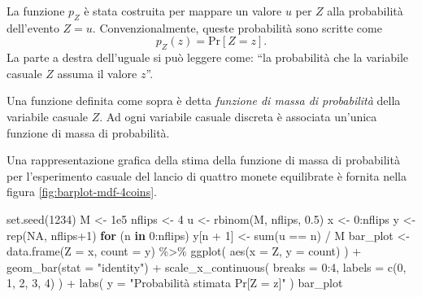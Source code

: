 \documentclass[
  10pt,
  italian,
  a4paper,
  extrafontsizes,onecolumn,openright
  ]{memoir}
\newenvironment{Shaded}{\begin{snugshade}}{\end{snugshade}}
\newcommand{\AttributeTok}[1]{\textcolor[rgb]{0.77,0.63,0.00}{#1}}
\newcommand{\ConstantTok}[1]{\textcolor[rgb]{0.00,0.00,0.00}{#1}}
\newcommand{\ControlFlowTok}[1]{\textcolor[rgb]{0.13,0.29,0.53}{\textbf{#1}}}
\newcommand{\DecValTok}[1]{\textcolor[rgb]{0.00,0.00,0.81}{#1}}
\newcommand{\FloatTok}[1]{\textcolor[rgb]{0.00,0.00,0.81}{#1}}
\newcommand{\FunctionTok}[1]{\textcolor[rgb]{0.00,0.00,0.00}{#1}}
\newcommand{\NormalTok}[1]{#1}
\newcommand{\OtherTok}[1]{\textcolor[rgb]{0.56,0.35,0.01}{#1}}
\newcommand{\SpecialCharTok}[1]{\textcolor[rgb]{0.00,0.00,0.00}{#1}}
\newcommand{\StringTok}[1]{\textcolor[rgb]{0.31,0.60,0.02}{#1}}
\theoremstyle{definition}
\theoremstyle{definition}
\theoremstyle{definition}
\theoremstyle{definition}
\theoremstyle{remark}
\begin{document}
La funzione \(p_Z\) è stata costruita per mappare un valore \(u\) per \(Z\) alla probabilità dell'evento \(Z = u\). Convenzionalmente, queste probabilità sono scritte come
\[
p_Z(z) = \mbox{Pr}[Z = z].
\]
La parte a destra dell'uguale si può leggere come: ``la probabilità che la variabile casuale \(Z\) assuma il valore \(z\)''.

Una funzione definita come sopra è detta \emph{funzione di massa di probabilità} della variabile casuale \(Z\). Ad ogni variabile casuale discreta è associata un'unica funzione di massa di probabilità.

Una rappresentazione grafica della stima della funzione di massa di probabilità per l'esperimento casuale del lancio di quattro monete equilibrate è fornita nella figura \ref{fig:barplot-mdf-4coins}.

\begin{Shaded}
\begin{Highlighting}[]
\FunctionTok{set.seed}\NormalTok{(}\DecValTok{1234}\NormalTok{)}
\NormalTok{M }\OtherTok{\textless{}{-}} \FloatTok{1e5}
\NormalTok{nflips }\OtherTok{\textless{}{-}} \DecValTok{4}
\NormalTok{u }\OtherTok{\textless{}{-}} \FunctionTok{rbinom}\NormalTok{(M, nflips, }\FloatTok{0.5}\NormalTok{)}
\NormalTok{x }\OtherTok{\textless{}{-}} \DecValTok{0}\SpecialCharTok{:}\NormalTok{nflips}
\NormalTok{y }\OtherTok{\textless{}{-}} \FunctionTok{rep}\NormalTok{(}\ConstantTok{NA}\NormalTok{, nflips}\SpecialCharTok{+}\DecValTok{1}\NormalTok{)}
\ControlFlowTok{for}\NormalTok{ (n }\ControlFlowTok{in} \DecValTok{0}\SpecialCharTok{:}\NormalTok{nflips)}
\NormalTok{  y[n }\SpecialCharTok{+} \DecValTok{1}\NormalTok{] }\OtherTok{\textless{}{-}} \FunctionTok{sum}\NormalTok{(u }\SpecialCharTok{==}\NormalTok{ n) }\SpecialCharTok{/}\NormalTok{ M}
\NormalTok{bar\_plot }\OtherTok{\textless{}{-}}
  \FunctionTok{data.frame}\NormalTok{(}\AttributeTok{Z =}\NormalTok{ x, }\AttributeTok{count =}\NormalTok{ y) }\SpecialCharTok{\%\textgreater{}\%} 
  \FunctionTok{ggplot}\NormalTok{(}
    \FunctionTok{aes}\NormalTok{(}\AttributeTok{x =}\NormalTok{ Z, }\AttributeTok{y =}\NormalTok{ count)}
\NormalTok{  ) }\SpecialCharTok{+}
  \FunctionTok{geom\_bar}\NormalTok{(}\AttributeTok{stat =} \StringTok{"identity"}\NormalTok{) }\SpecialCharTok{+}
  \FunctionTok{scale\_x\_continuous}\NormalTok{(}
    \AttributeTok{breaks =} \DecValTok{0}\SpecialCharTok{:}\DecValTok{4}\NormalTok{,}
    \AttributeTok{labels =} \FunctionTok{c}\NormalTok{(}\DecValTok{0}\NormalTok{, }\DecValTok{1}\NormalTok{, }\DecValTok{2}\NormalTok{, }\DecValTok{3}\NormalTok{, }\DecValTok{4}\NormalTok{)}
\NormalTok{  ) }\SpecialCharTok{+}
  \FunctionTok{labs}\NormalTok{(}
    \AttributeTok{y =} \StringTok{"Probabilità stimata Pr[Z = z]"}
\NormalTok{)}
\NormalTok{bar\_plot}
\end{Highlighting}
\end{Shaded}
\end{document}
